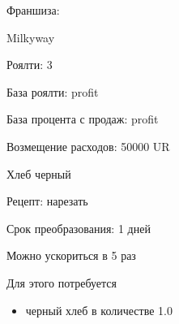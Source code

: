 \documentclass[a4paper,12pt]{article}
\begin{document}
Франшиза:
  
      Milkyway

      Роялти: 3
      
      База роялти: profit
      
      База процента с продаж: profit

      Возмещение расходов: 50000 UR
  



  
      Хлеб черный

      Рецепт: нарезать

      Срок преобразования: 1 дней
      
      Можно ускориться в 5 раз

      
      Для этого потребуется
      \begin{itemize}
      
      \item черный хлеб в количестве 1.0
      
      \end{itemize}
      
  


\end{document}
